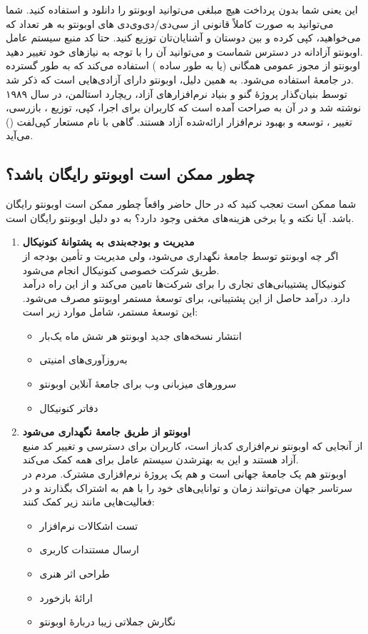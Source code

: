 این یعنی شما بدون پرداخت هیچ مبلغی می‌توانید اوبونتو را دانلود و استفاده کنید. شما می‌توانید به صورت کاملاً قانونی از سی‌دی/دی‌وی‌دی های اوبونتو به هر تعداد که می‌خواهید، کپی کرده و بین دوستان و آشنایان‌تان توزیع کنید. حتا کد منبع سیستم عامل اوبونتو آزادانه در دسترس شماست و می‌توانید آن را با توجه به نیازهای خود تغییر دهید.\\
اوبونتو از مجوز عمومی همگانی   (یا به طور ساده ) استفاده می‌کند که به طور گسترده در جامعهٔ  استفاده می‌شود. به همین دلیل، اوبونتو دارای آزادی‌هایی است که ذکر شد.\\
 توسط بنیان‌گذار پروژهٔ گنو و بنیاد نرم‌افزارهای آزاد، ریچارد استالمن، در سال ۱۹۸۹ نوشته شد و در آن به صراحت آمده است که کاربران برای اجرا، کپی، توزیع ، بازرسی، تغییر ، توسعه و بهبود نرم‌افزار ارائه‌شده آزاد هستند. گاهی  با  نام مستعار کپی‌لفت () می‌آید.

\subsection{چطور ممکن است اوبونتو رایگان باشد؟}
شما ممکن است تعجب کنید که در حال حاضر واقعاً چطور ممکن است اوبونتو رایگان باشد. آیا نکته و یا برخی هزینه‌های مخفی وجود دارد؟ به دو دلیل اوبونتو رایگان است.\\
\begin{enumerate}
\item \textbf{مدیریت و بودجه‌بندی به پشتوانهٔ کنونیکال}\\
اگر چه  اوبونتو توسط جامعهٔ  نگهداری می‌شود، ولی مدیریت و تأمین بودجه از طریق شرکت خصوصی کنونیکال انجام می‌شود.\\
کنونیکال پشتیبانی‌های تجاری را برای شرکت‌ها تامین می‌کند و از این راه درآمد دارد. درآمد حاصل از این پشتیبانی، برای توسعهٔ مستمر اوبونتو مصرف می‌شود. این توسعهٔ مستمر، شامل موارد زیر است:
\begin{itemize}
\item انتشار نسخه‌های جدید اوبونتو هر شش ماه یک‌بار
\item به‌روزآوری‌های امنیتی
\item سرورهای میزبانی وب برای جامعهٔ آنلاین اوبونتو 
\item دفاتر کنونیکال
\end{itemize}
\item \textbf{اوبونتو از طریق جامعهٔ  نگهداری می‌شود}\\
از آنجایی که اوبونتو نرم‌افزاری کدباز است، کاربران برای دسترسی و تغییر کد منبع آزاد هستند و این به بهترشدن سیستم عامل برای همه کمک می‌کند.\\
اوبونتو هم یک جامعهٔ جهانی است و هم یک پروژهٔ نرم‌افزاری مشترک. مردم در سرتاسر جهان می‌توانند زمان و توانایی‌های خود را با هم به اشتراک بگذارند و در فعالیت‌هایی مانند زیر کمک کنند:
\begin{itemize}
\item تست اشکالات نرم‌افزار
\item ارسال مستندات کاربری
\item طراحی اثر هنری
\item ارائهٔ بازخورد
\item نگارش جملاتی زیبا دربارهٔ اوبونتو
\end{itemize}
\end{enumerate}

